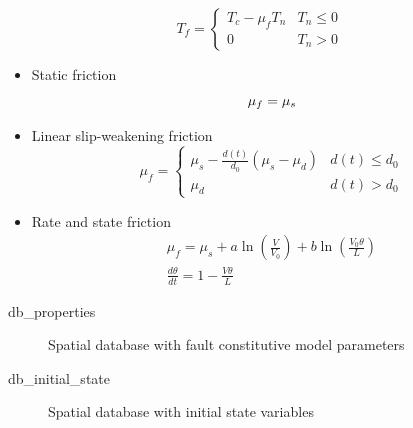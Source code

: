 \documentclass[pdftex,cig,slideColor]{pp4slides}
\begin{document}

  \vfill
  \begin{equation}
    T_f = \begin{cases}
      T_c - \mu_f T_n & T_n \leq 0 \\
      0 & T_n > 0
    \end{cases}
  \end{equation}
  \vfill

  \begin{itemize}
  \item Static friction
    \begin{equation}
    \vspace*{-14pt}
      \mu_f = \mu_s
    \end{equation}
  \item Linear slip-weakening friction
    \vspace*{-14pt}
    \begin{equation}
      \mu_f = \begin{cases}
        \mu_s - \frac{d(t)}{d_0}(\mu_s - \mu_d) & d(t) \leq d_0 \\
        \mu_d & d(t) > d_0
      \end{cases}
    \end{equation}
  \item Rate and state friction
    \vspace*{-14pt}
    \begin{gather}
      \mu_f = \mu_s + a \ln \left(\frac{V}{V_0} \right) + b \ln \left( \frac{V_0
        \theta}{L} \right) \\
      \frac{d\theta}{dt} = 1 - \frac{V \theta}{L}
    \end{gather}
 \end{itemize}



  \begin{description}
  \item[db\_properties] Spatial database with fault constitutive model parameters
  \item[db\_initial\_state] Spatial database with initial state variables
  \end{description}

\end{document}

